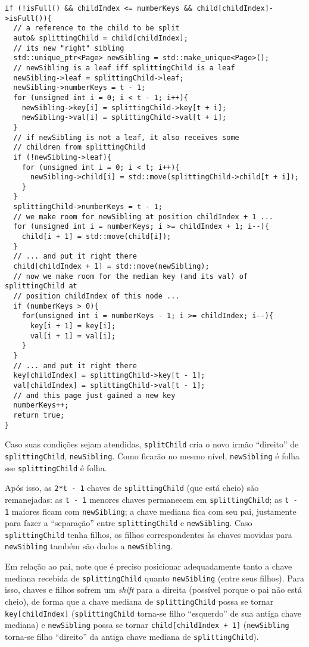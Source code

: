 \documentclass[11pt]{article}
\begin{document}
\pagebreak

\begin{verbatim}
if (!isFull() && childIndex <= numberKeys && child[childIndex]->isFull()){
  // a reference to the child to be split
  auto& splittingChild = child[childIndex];
  // its new "right" sibling
  std::unique_ptr<Page> newSibling = std::make_unique<Page>();
  // newSibling is a leaf iff splittingChild is a leaf
  newSibling->leaf = splittingChild->leaf;
  newSibling->numberKeys = t - 1;
  for (unsigned int i = 0; i < t - 1; i++){
    newSibling->key[i] = splittingChild->key[t + i];
    newSibling->val[i] = splittingChild->val[t + i];
  }
  // if newSibling is not a leaf, it also receives some
  // children from splittingChild
  if (!newSibling->leaf){
    for (unsigned int i = 0; i < t; i++){
      newSibling->child[i] = std::move(splittingChild->child[t + i]);
    }
  }
  splittingChild->numberKeys = t - 1;
  // we make room for newSibling at position childIndex + 1 ...
  for (unsigned int i = numberKeys; i >= childIndex + 1; i--){
    child[i + 1] = std::move(child[i]);
  }
  // ... and put it right there
  child[childIndex + 1] = std::move(newSibling);
  // now we make room for the median key (and its val) of splittingChild at
  // position childIndex of this node ...
  if (numberKeys > 0){
    for(unsigned int i = numberKeys - 1; i >= childIndex; i--){
      key[i + 1] = key[i];
      val[i + 1] = val[i];
    }
  }
  // ... and put it right there
  key[childIndex] = splittingChild->key[t - 1];
  val[childIndex] = splittingChild->val[t - 1];
  // and this page just gained a new key
  numberKeys++;
  return true;
}
\end{verbatim}

Caso suas condições sejam atendidas, \texttt{splitChild} cria o novo
irmão ``direito'' de \texttt{splittingChild}, \texttt{newSibling}.  Como ficarão
no mesmo nível, \texttt{newSibling} é folha sse \texttt{splittingChild} é folha.

Após isso, as \texttt{2*t - 1} chaves de \texttt{splittingChild} (que está
cheio) são remanejadas: as \texttt{t - 1} menores chaves permanecem em
\texttt{splittingChild}; as \texttt{t - 1} maiores ficam com \texttt{newSibling}; a
chave mediana fica com seu pai, justamente para fazer a
``separação'' entre \texttt{splittingChild} e \texttt{newSibling}.  Caso
\texttt{splittingChild} tenha filhos, os filhos correspondentes às chaves
movidas para \texttt{newSibling} também são dados a \texttt{newSibling}.

Em relação ao pai, note que é preciso posicionar adequadamente
tanto a chave mediana recebida de \texttt{splittingChild} quanto
\texttt{newSibling} (entre seus filhos).  Para isso, chaves e filhos
sofrem um \emph{shift} para a direita (possível porque o pai não está
cheio), de forma que a chave mediana de \texttt{splittingChild} possa se
tornar \texttt{key[childIndex]} (\texttt{splittingChild} torna-se filho
``esquerdo'' de sua antiga chave mediana) e \texttt{newSibling} possa se
tornar \texttt{child[childIndex + 1]} (\texttt{newSibling} torna-se filho
``direito'' da antiga chave mediana de \texttt{splittingChild}).
\end{document}
